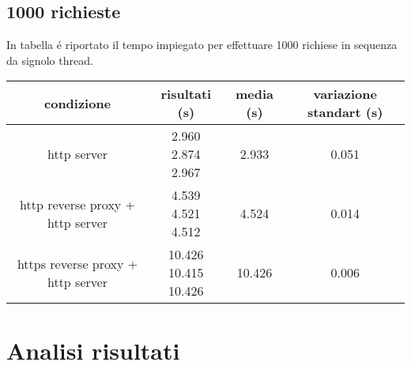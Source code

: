 \subsection{1000 richieste}
In tabella é riportato il tempo impiegato per effettuare 1000 richiese in sequenza da signolo thread.
\begin{center}
  \begin{tabular}{|c|c|c|c|}
    \hline
    condizione & risultati (s) & media (s) & variazione standart (s) \\
    \hline
    \hline
    http server & \makecell {2.960 \\ 2.874 \\ 2.967} & 2.933 & 0.051 \\
    \hline
    http reverse proxy + http server & \makecell {4.539 \\ 4.521 \\ 4.512} & 4.524 & 0.014 \\
    \hline
    https reverse proxy + http server & \makecell {10.426 \\ 10.415 \\ 10.426} & 10.426 & 0.006 \\
    \hline
  \end{tabular}
\end{center}

\begin{center}
\end{center}

\section{Analisi risultati}
